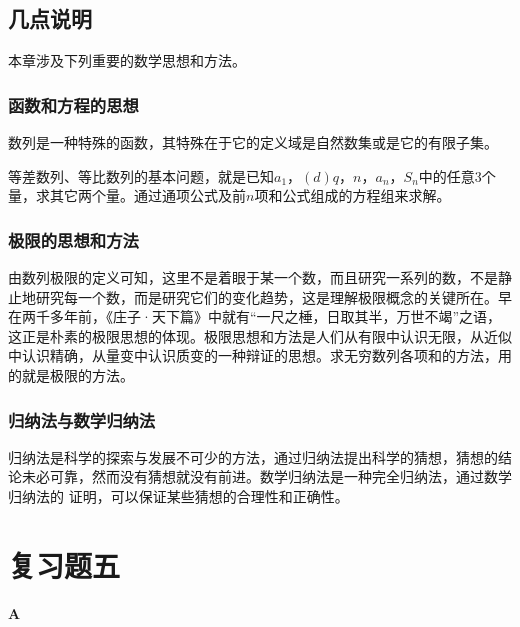 \subsection{几点说明}

本章涉及下列重要的数学思想和方法。
\subsubsection{函数和方程的思想}
数列是一种特殊的函数，其特殊在于它的定义域是自然数集或是它的有限子集。

等差数列、等比数列的基本问题，就是已知$a_1$，$(d)q$，$n$，$a_n$，$S_n$中的任意3个量，求其它两个量。通过通项公式及前$n$项和公式组成的方程组来求解。

\subsubsection{极限的思想和方法}
由数列极限的定义可知，这里不是着眼于某一个数，而且研究一系列的数，不是静止地研究每一个数，而是研究它们的变化趋势，这是理解极限概念的关键所在。早在两千多年前，《庄子·天下篇》中就有“一尺之棰，日取其半，万世不竭”之语，这正是朴素的极限思想的体现。极限思想和方法是人们从有限中认识无限，从近似中认识精确，从量变中认识质变的一种辩证的思想。求无穷数列各项和的方法，用的就是极限的方法。

\subsubsection{归纳法与数学归纳法}
归纳法是科学的探索与发展不可少的方法，通过归纳法提出科学的猜想，猜想的结论未必可靠，然而没有猜想就没有前进。数学归纳法是一种完全归纳法，通过数学归纳法的
证明，可以保证某些猜想的合理性和正确性。

\section*{复习题五}
\begin{center}
    \bfseries A
\end{center}

